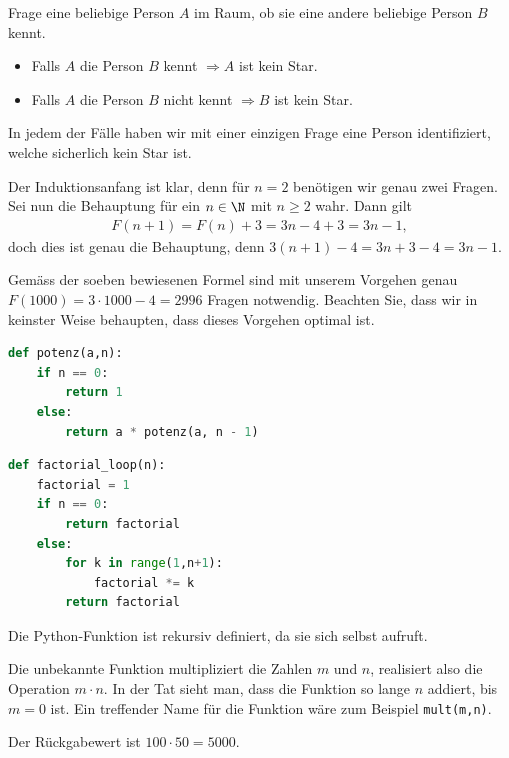 \begin{myanswer}[myexercise:0351]
  Frage eine beliebige Person $A$ im Raum, ob sie eine andere beliebige Person $B$ kennt.
\begin{itemize}
    \item Falls $A$ die Person $B$ kennt $\Rightarrow A$ ist kein Star.
    \item Falls $A$ die Person $B$ nicht kennt $\Rightarrow B$ ist kein Star.
\end{itemize}
In jedem der Fälle haben wir mit einer einzigen Frage eine Person identifiziert, welche sicherlich kein Star ist.
\end{myanswer}


\begin{myanswer}[myexercise:0352]
Der Induktionsanfang ist klar, denn für $n = 2$ benötigen wir genau zwei Fragen. Sei nun die Behauptung für ein $n\in\N$ mit $n\geq 2$ wahr. Dann gilt
\begin{align*}
    F(n+1) = F(n) + 3 = 3n-4 + 3 = 3n - 1,
\end{align*}
doch dies ist genau die Behauptung, denn $3(n+1)-4 = 3n+3-4=3n-1$.

Gemäss der soeben bewiesenen Formel sind mit unserem Vorgehen genau $F(1000) = 3\cdot 1000 - 4 = 2996$ Fragen notwendig. Beachten Sie, dass wir in keinster Weise behaupten, dass dieses Vorgehen optimal ist.
\end{myanswer}

\clearpage

\begin{myanswer}[myexercise:0303]
\begin{lstlisting}[language=Python,caption=rekursive Potenz-Funktion]
def potenz(a,n):
    if n == 0:
        return 1
    else:
        return a * potenz(a, n - 1)
\end{lstlisting}
\end{myanswer}


\begin{myanswer}[myexercise:0302]
\begin{lstlisting}[language=Python,caption=rekursive Potenz-Funktion]
def factorial_loop(n):
    factorial = 1
    if n == 0:
        return factorial
    else:
        for k in range(1,n+1):
            factorial *= k
        return factorial
\end{lstlisting}
\end{myanswer}
\clearpage

\begin{myanswer}[myexercise:0304]
\begin{aenum}
    \item Die Python-Funktion ist rekursiv definiert, da sie sich selbst aufruft.
    \item Die unbekannte Funktion multipliziert die Zahlen $m$ und $n$, realisiert also die Operation $m\cdot n$. In der Tat sieht man, dass die Funktion so lange $n$ addiert, bis $m = 0$ ist. Ein treffender Name für die Funktion wäre zum Beispiel \lstinline|mult(m,n)|.
    \item Der Rückgabewert ist $100\cdot 50 = 5000$.
\end{aenum}
\end{myanswer}


